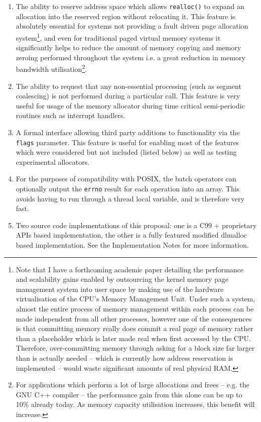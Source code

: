 \documentclass[wd]{isov2}
\begin{document}
{\begin{introduction}
\begin{enumerate}
\item The ability to reserve address space which allows \texttt{realloc()} to expand an allocation into the reserved region without relocating it. This feature is absolutely essential for systems not providing a fault driven page allocation system\footnote{Note that I have a forthcoming academic paper detailing the performance and scalability gains enabled by outsourcing the kernel memory page management system into user space by making use of the hardware virtualisation of the CPU's Memory Management Unit. Under such a system, almost the entire process of memory management within each process can be made independent from all other processes, however one of the consequences is that committing memory really does commit a real page of memory rather than a placeholder which is later made real when first accessed by the CPU. Therefore, over-committing memory through asking for a block size far larger than is actually needed -- which is currently how address reservation is implemented -- would waste significant amounts of real physical RAM.}, and even for traditional paged virtual memory systems it significantly helps to reduce the amount of memory copying and memory zeroing performed throughout the system i.e. a great reduction in memory bandwidth utilisation\footnote{For applications which perform a lot of large allocations and frees -- e.g. the GNU C++ compiler -- the performance gain from this alone can be up to 10\% already today. As memory capacity utilisation increases, this benefit will increase.}.
\item The ability to request that any non-essential processing (such as segment coalescing) is not performed during a particular call. This feature is very useful for usage of the memory allocator during time critical semi-periodic routines such as interrupt handlers.
\item A formal interface allowing third party additions to functionality via the \texttt{flags} parameter. This feature is useful for enabling most of the features which were considered but not included (listed below) as well as testing experimental allocators.
\item For the purposes of compatibility with POSIX, the batch operators can optionally output the \texttt{errno} result for each operation into an array. This avoids having to run through a thread local variable, and is therefore very fast.
\item Two source code implementations of this proposal: one is a C99 + proprietary APIs based implementation, the other is a fully featured modified dlmalloc based implementation. See the Implementation Notes for more information.
\end{enumerate}


\end{introduction}}
\end{document}

